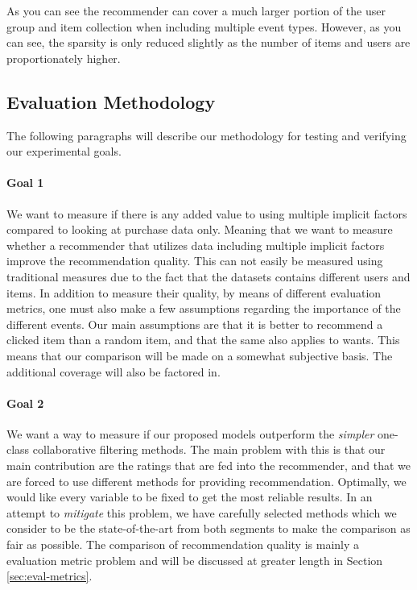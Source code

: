 As you can see the recommender can cover a much larger portion of the user group
and item collection when including multiple event types. However, as you can see, the sparsity is
only reduced slightly as the number of items and users are proportionately higher.

\subsection{Evaluation Methodology}

The following paragraphs will describe our methodology for testing and verifying our experimental
goals.

\paragraph{Goal 1}

We want to measure if there is any added value to using multiple implicit factors compared to
looking at purchase data only. Meaning that we want to measure whether a recommender that utilizes
data including multiple implicit factors improve the recommendation quality. This can not
easily be measured using traditional measures due to the fact that the datasets contains
different users and items. In addition to measure their quality, by means of different
evaluation metrics, one must also make a few assumptions regarding the importance
of the different events. Our main assumptions are that it is better to recommend a clicked
item than a random item, and that the same also applies to wants. This means that our comparison
will be made on a somewhat subjective basis. The additional coverage will also be factored in. 

\paragraph{Goal 2}

We want a way to measure if our proposed models outperform the \emph{simpler} one-class
collaborative filtering methods. The main problem with this is that our main contribution
are the ratings that are fed into the recommender, and that we are forced to use different
methods for providing recommendation. Optimally, we would like every variable to be fixed
to get the most reliable results. In an attempt to \emph{mitigate} this problem, we 
have carefully selected methods which we consider to be the state-of-the-art from both segments
to make the comparison as fair as possible. The comparison of recommendation quality
is mainly a evaluation metric problem and will be discussed at greater length in
Section \ref{sec:eval-metrics}.

